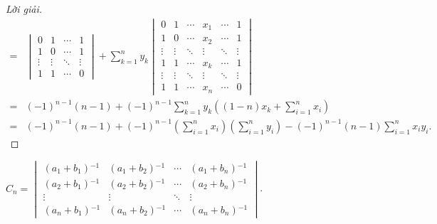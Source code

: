 \documentclass[class=linearalgebra,crop=false]{standalone}
\begin{document}
\begin{proof}[Lời giải]
\begin{align*}
        = &
        \begin{vmatrix}
            0      & 1      & \cdots & 1      \\
            1      & 0      & \cdots & 1      \\
            \vdots & \vdots & \ddots & \vdots \\
            1      & 1      & \cdots & 0
        \end{vmatrix}
        +
        \sum^{n}_{k=1}y_{k}
        \begin{vmatrix}
            0      & 1      & \cdots & x_{1}  & \cdots & 1      \\
            1      & 0      & \cdots & x_{2}  & \cdots & 1      \\
            \vdots & \vdots & \ddots & \vdots & \ddots & \vdots \\
            1      & 1      & \cdots & x_{k}  & \cdots & 1      \\
            \vdots & \vdots & \ddots & \vdots & \ddots & \vdots \\
            1      & 1      & \cdots & x_{n}  & \cdots & 0
        \end{vmatrix}                                                                                         \\
        = &
        (-1)^{n-1}(n-1) + (-1)^{n-1}\sum^{n}_{k=1}y_{k}\left((1-n)x_{k} + \sum^{n}_{i=1}x_{i}\right)                                                \\
        = & (-1)^{n-1}(n-1) + (-1)^{n-1}\left(\sum^{n}_{i=1}x_{i}\right)\left(\sum^{n}_{i=1}y_{i}\right) - (-1)^{n-1}(n-1)\sum^{n}_{i=1}x_{i}y_{i}.
    \end{align*}
    \endgroup
\end{proof}

\begin{exercise}
    $C_{n} = \begin{vmatrix}
            (a_{1} + b_{1}){}^{-1} & (a_{1} + b_{2}){}^{-1} & \cdots & (a_{1} + b_{n}){}^{-1} \\
            (a_{2} + b_{1}){}^{-1} & (a_{2} + b_{2}){}^{-1} & \cdots & (a_{2} + b_{n}){}^{-1} \\
            \vdots                 & \vdots                 & \ddots & \vdots                 \\
            (a_{n} + b_{1}){}^{-1} & (a_{n} + b_{2}){}^{-1} & \cdots & (a_{n} + b_{n}){}^{-1}
        \end{vmatrix}$.
\end{exercise}
\end{document}
